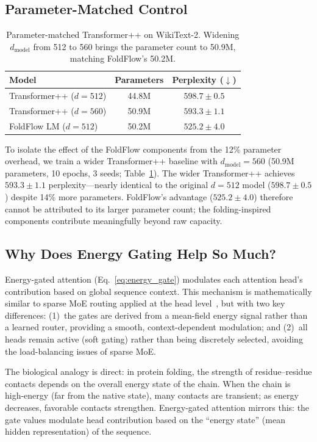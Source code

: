 \documentclass[10pt]{article}
\begin{document}
\subsection{Parameter-Matched Control}
\label{sec:param_matched}

\begin{table}[t]
\centering
\caption{Parameter-matched Transformer++ on WikiText-2.  Widening
  $d_\text{model}$ from 512 to 560 brings the parameter count
  to 50.9M, matching FoldFlow's 50.2M.}
\label{tab:lm_matched}
\small
\begin{tabular}{@{}lcc@{}}
\toprule
Model & Parameters & Perplexity ($\downarrow$) \\
\midrule
Transformer++ ($d{=}512$) & 44.8M & $598.7 \pm 0.5$ \\
Transformer++ ($d{=}560$) & 50.9M & $593.3 \pm 1.1$ \\
FoldFlow LM ($d{=}512$)   & 50.2M & $525.2 \pm 4.0$ \\
\bottomrule
\end{tabular}
\end{table}

To isolate the effect of the FoldFlow components from the 12\%
parameter overhead, we train a wider Transformer++ baseline with
$d_\text{model}{=}560$ (50.9M parameters, 10 epochs, 3 seeds;
Table~\ref{tab:lm_matched}).  The wider Transformer++
achieves $593.3 \pm 1.1$ perplexity---nearly identical to the
original $d{=}512$ model ($598.7 \pm 0.5$) despite 14\% more
parameters.  FoldFlow's advantage ($525.2 \pm 4.0$) therefore cannot
be attributed to its larger parameter count; the folding-inspired
components contribute meaningfully beyond raw capacity.

\subsection{Why Does Energy Gating Help So Much?}

Energy-gated attention (Eq.~\ref{eq:energy_gate}) modulates each
attention head's contribution based on global sequence context.
This mechanism is mathematically similar to sparse MoE routing
applied at the head level~\citep{shazeer2017outrageously}, but with
two key differences: (1)~the gates are derived from a mean-field
energy signal rather than a learned router, providing a smooth,
context-dependent modulation; and (2)~all heads remain active
(soft gating) rather than being discretely selected, avoiding the
load-balancing issues of sparse MoE.

The biological analogy is direct: in protein folding, the strength
of residue--residue contacts depends on the overall energy state of
the chain.  When the chain is high-energy (far from the native state),
many contacts are transient; as energy decreases, favorable contacts
strengthen.  Energy-gated attention mirrors this: the gate values
modulate head contribution based on the ``energy state'' (mean hidden
representation) of the sequence.
\end{document}
